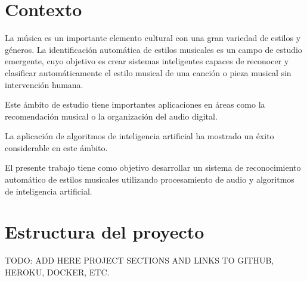 
\section{Contexto}

La música es un importante elemento cultural con una gran variedad de estilos y géneros.
La identificación automática de estilos musicales es un campo de estudio emergente, cuyo objetivo es crear sistemas inteligentes capaces de reconocer y clasificar automáticamente el estilo musical de una canción o pieza musical sin intervención humana. 

Este ámbito de estudio tiene importantes aplicaciones en áreas como la recomendación musical o la organización del audio digital.

La aplicación de algoritmos de inteligencia artificial ha mostrado un éxito considerable en este ámbito.

El presente trabajo tiene como objetivo desarrollar un sistema de reconocimiento automático de estilos musicales utilizando procesamiento de audio y algoritmos de inteligencia artificial.

\section{Estructura del proyecto}

TODO: ADD HERE PROJECT SECTIONS AND LINKS TO GITHUB, HEROKU, DOCKER, ETC.